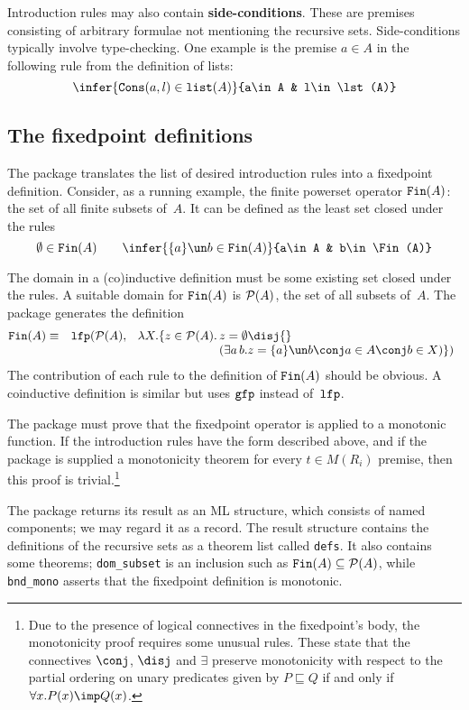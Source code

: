 Introduction rules may also contain {\bf side-conditions}.  These are
premises consisting of arbitrary formulae not mentioning the recursive
sets. Side-conditions typically involve type-checking.  One example is the
premise $a\in A$ in the following rule from the definition of lists:
\[ \infer{\Cons(a,l)\in\lst(A)}{a\in A & l\in\lst(A)} \]

\subsection{The fixedpoint definitions}
The package translates the list of desired introduction rules into a fixedpoint
definition.  Consider, as a running example, the finite powerset operator
$\hbox{\tt Fin}(A)$: the set of all finite subsets of~$A$.  It can be
defined as the least set closed under the rules
\[  \emptyset\in\Fin(A)  \qquad 
    \infer{\{a\}\un b\in\Fin(A)}{a\in A & b\in\Fin(A)} 
\]

The domain in a (co)inductive definition must be some existing set closed
under the rules.  A suitable domain for $\hbox{\tt Fin}(A)$ is ${\cal P}(A)$, the set of all
subsets of~$A$.  The package generates the definition
\begin{eqnarray*}
  \Fin(A) & \equiv &  \lfp(\pow(A), \;
  \begin{array}[t]{r@{\,}l}
      \lambda X. \{z\in\pow(A). & z=\emptyset \disj{} \\
                  &(\exists a\,b. z=\{a\}\un b\conj a\in A\conj b\in X)\})
  \end{array}
\end{eqnarray*} 
The contribution of each rule to the definition of $\hbox{\tt Fin}(A)$ should be
obvious.  A coinductive definition is similar but uses $\hbox{\tt gfp}$ instead
of~$\hbox{\tt lfp}$.

The package must prove that the fixedpoint operator is applied to a
monotonic function.  If the introduction rules have the form described
above, and if the package is supplied a monotonicity theorem for every
$t\in M(R_i)$ premise, then this proof is trivial.\footnote{Due to the
  presence of logical connectives in the fixedpoint's body, the
  monotonicity proof requires some unusual rules.  These state that the
  connectives $\conj$, $\disj$ and $\exists$ preserve monotonicity with respect
  to the partial ordering on unary predicates given by $P\sqsubseteq Q$ if and
  only if $\forall x.P(x)\imp Q(x)$.}

The package returns its result as an ML structure, which consists of named
components; we may regard it as a record.  The result structure contains
the definitions of the recursive sets as a theorem list called {\tt defs}.
It also contains some theorems; {\tt dom\_subset} is an inclusion such as 
$\hbox{\tt Fin}(A)\subseteq{\cal P}(A)$, while {\tt bnd\_mono} asserts that the fixedpoint
definition is monotonic.


